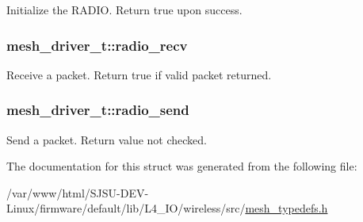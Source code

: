 Initialize the R\+A\+D\+IO. Return true upon success. 

\subsubsection[{\texorpdfstring{radio\+\_\+recv}{radio_recv}}]{ mesh\+\_\+driver\+\_\+t\+::radio\+\_\+recv}\hypertarget{structmesh__driver__t_abd2f06c3ce4baa0c735629e9df295b3f}{}\label{structmesh__driver__t_abd2f06c3ce4baa0c735629e9df295b3f}


Receive a packet. Return true if valid packet returned. 

\subsubsection[{\texorpdfstring{radio\+\_\+send}{radio_send}}]{ mesh\+\_\+driver\+\_\+t\+::radio\+\_\+send}\hypertarget{structmesh__driver__t_a5516b86cc03fcc2512b04d9978645c69}{}\label{structmesh__driver__t_a5516b86cc03fcc2512b04d9978645c69}


Send a packet. Return value not checked. 



The documentation for this struct was generated from the following file\+:\begin{DoxyCompactItemize}
\item 
/var/www/html/\+S\+J\+S\+U-\/\+D\+E\+V-\/\+Linux/firmware/default/lib/\+L4\+\_\+\+I\+O/wireless/src/\hyperlink{mesh__typedefs_8h}{mesh\+\_\+typedefs.\+h}\end{DoxyCompactItemize}

